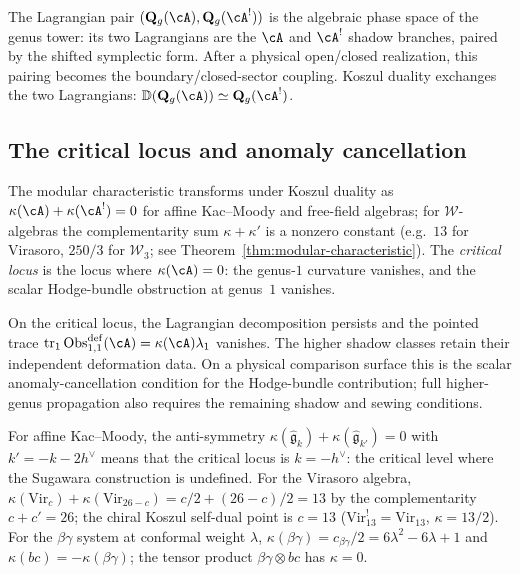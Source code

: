 The Lagrangian pair $(\mathbf{Q}_g(\cA), \mathbf{Q}_g(\cA^!))$ is the
algebraic phase space of the genus tower: its two Lagrangians are the
$\cA$ and $\cA^!$ shadow branches, paired by the shifted symplectic
form. After a physical open/closed realization, this pairing becomes
the boundary/closed-sector coupling. Koszul duality exchanges the two
Lagrangians: $\mathbb{D}(\mathbf{Q}_g(\cA)) \simeq \mathbf{Q}_g(\cA^!)$.

\subsection{The critical locus and anomaly cancellation}
\label{subsec:thqg-intro-critical-locus}

The modular characteristic transforms under Koszul duality as
$\kappa(\cA) + \kappa(\cA^!) = 0$ for affine Kac--Moody and free-field
algebras; for $\mathcal{W}$-algebras the complementarity sum
$\kappa + \kappa'$ is a nonzero constant
(e.g.\ $13$ for Virasoro, $250/3$ for $\mathcal{W}_3$; see
Theorem~\ref{thm:modular-characteristic}). The \emph{critical locus} is the
locus where $\kappa(\cA) = 0$: the genus-$1$ curvature vanishes, and
the scalar Hodge-bundle obstruction at genus~$1$ vanishes.

On the critical locus, the Lagrangian decomposition persists and the
pointed trace
$\operatorname{tr}_1\operatorname{Obs}^{\mathrm{def}}_{1,1}(\cA)
=\kappa(\cA)\lambda_1$ vanishes.  The higher shadow classes retain
their independent deformation data. On a physical comparison surface
this is the scalar anomaly-cancellation condition for
the Hodge-bundle contribution; full higher-genus propagation also
requires the remaining shadow and sewing conditions.

For affine Kac--Moody, the anti-symmetry $\kappa(\widehat{\mathfrak{g}}_k)
+ \kappa(\widehat{\mathfrak{g}}_{k'}) = 0$ with $k' = -k - 2h^\vee$ means
that the critical locus is $k = -h^\vee$: the critical level where the
Sugawara construction is undefined. For the Virasoro algebra,
$\kappa(\mathrm{Vir}_c) + \kappa(\mathrm{Vir}_{26-c}) = c/2 + (26-c)/2 = 13$ by the
complementarity $c + c' = 26$; the chiral Koszul self-dual point is $c = 13$
($\mathrm{Vir}_{13}^! = \mathrm{Vir}_{13}$, $\kappa = 13/2$). For the $\beta\gamma$ system
at conformal weight $\lambda$,
$\kappa(\beta\gamma) = c_{\beta\gamma}/2 = 6\lambda^2 - 6\lambda + 1$ and $\kappa(bc) = -\kappa(\beta\gamma)$; the
tensor product
$\beta\gamma \otimes bc$ has $\kappa = 0$.

